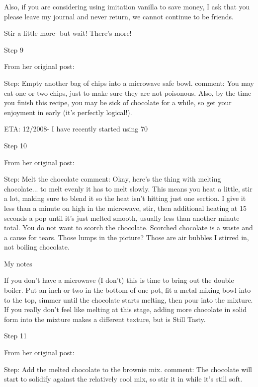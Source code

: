 Also, if you are considering using imitation vanilla to save money, I ask that you please leave my journal and never return, we cannot continue to be friends.

Stir a little more- but wait! There's more!

Step 9

From her original post:

Step: Empty another bag of chips into a microwave safe bowl.
comment: You may eat one or two chips, just to make sure they are not poisonous.
Also, by the time you finish this recipe, you may be sick of chocolate for a while, so get your enjoyment in early (it's perfectly logical!).

ETA: 12/2008- I have recently started using 70%

Step 10

From her original post:

Step: Melt the chocolate
comment: Okay, here's the thing with melting chocolate... to melt evenly it has to melt slowly. This means you heat a little, stir a lot, making sure to blend it so the heat isn't hitting just one section. I give it less than a minute on high in the microwave, stir, then additional heating at 15 seconds a pop until it's just melted smooth, usually less than another minute total. You do not want to scorch the chocolate. Scorched chocolate is a waste and a cause for tears. Those lumps in the picture? Those are air bubbles I stirred in, not boiling chocolate.

My notes

If you don't have a microwave (I don't) this is time to bring out the double boiler. Put an inch or two in the bottom of one pot, fit a metal mixing bowl into to the top, simmer until the chocolate starts melting, then pour into the mixture. If you really don't feel like melting at this stage, adding more chocolate in solid form into the mixture makes a different texture, but is Still Tasty.

Step 11

From her original post:

Step: Add the melted chocolate to the brownie mix.
comment: The chocolate will start to solidify against the relatively cool mix, so stir it in while it's still soft.


